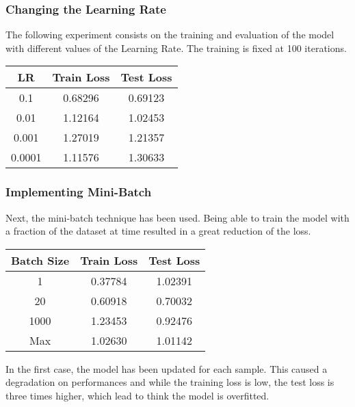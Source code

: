\documentclass[
	letterpaper, %
	10pt, %
]{class}
\begin{document}
\subsubsection{Changing the Learning Rate}

The following experiment consists on the training and evaluation of the model with different values of the Learning Rate. The training is fixed at 100 iterations.

\begin{center}
	\begin{tabular}{ |c|c|c| }
		\hline
		LR     & Train Loss & Test Loss \\
		\hline
		0.1    & 0.68296    & 0.69123   \\
		0.01   & 1.12164    & 1.02453   \\
		0.001  & 1.27019    & 1.21357   \\
		0.0001 & 1.11576    & 1.30633   \\
		\hline
	\end{tabular}
\end{center}



\subsubsection{Implementing Mini-Batch}

Next, the mini-batch technique has been used. Being able to train the model with a fraction of the dataset at time resulted in a great reduction of the loss.

\begin{center}
	\begin{tabular}{ |c|c|c| }
		\hline
		Batch Size & Train Loss & Test Loss \\
		\hline
		1          & 0.37784    & 1.02391   \\
		20         & 0.60918    & 0.70032   \\
		1000       & 1.23453    & 0.92476   \\
		Max        & 1.02630    & 1.01142   \\
		\hline
	\end{tabular}
\end{center}

In the first case, the model has been updated for each sample. This caused a degradation on performances and while the training loss is low, the test loss is three times higher, which lead to think the model is overfitted.\\
\end{document}
